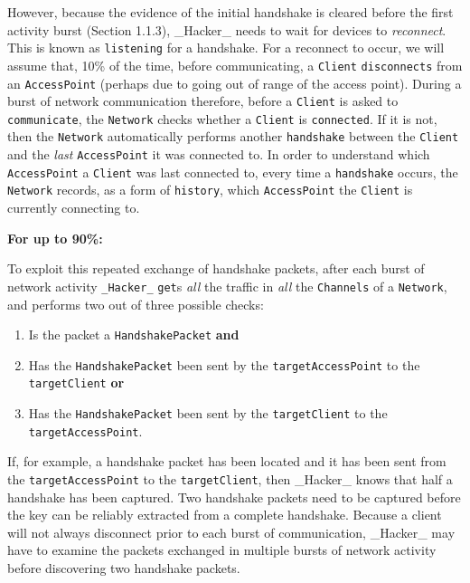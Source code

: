 \documentclass[11pt]{article}
\begin{document}
However, because the evidence of the initial handshake is cleared before the first activity burst  (Section 1.1.3), _Hacker_ needs to wait for devices to \emph{reconnect}. This is known as \texttt{listening} for a handshake. For a reconnect to occur, we will assume that, 10\% of the time, before communicating, a \texttt{Client} \texttt{disconnects} from an \texttt{AccessPoint} (perhaps due to going out of range of the access point). During a burst of network communication therefore, before a \texttt{Client} is asked to \texttt{communicate}, the \texttt{Network} checks whether a \texttt{Client} is \texttt{connected}. If it is not, then the \texttt{Network} automatically performs another \texttt{handshake} between the \texttt{Client} and the \emph{last} \texttt{AccessPoint} it was connected to. In order to understand which \texttt{AccessPoint} a \texttt{Client} was last connected to, every time a \texttt{handshake} occurs, the \texttt{Network} records, as a form of \texttt{history}, which \texttt{AccessPoint} the \texttt{Client} is currently connecting to.

\textbf{For up to 90\%:}

To exploit this repeated exchange of handshake packets, after each burst of network activity \texttt{_Hacker_} \texttt{get}s \emph{all} the traffic in  \emph{all} the \texttt{Channels} of a \texttt{Network}, and performs two out of three possible checks:

\begin{enumerate}
	
	\item Is the packet a \texttt{HandshakePacket} \textbf{and}
	
	\item Has the \texttt{HandshakePacket} been sent by the \texttt{targetAccessPoint} to the \texttt{targetClient} \textbf{or}
	
	\item Has the \texttt{HandshakePacket} been sent by the \texttt{targetClient} to the \texttt{targetAccessPoint}.

\end{enumerate}

If, for example, a handshake packet has been located and it has been sent from the \texttt{targetAccessPoint} to the \texttt{targetClient}, then _Hacker_ knows that half a handshake has been captured. Two handshake packets need to be captured before the key can be reliably extracted from a complete handshake. Because a client will not always disconnect prior to each burst of communication, _Hacker_ may have to examine the packets exchanged in multiple bursts of network activity before discovering two handshake packets.
\end{document}
